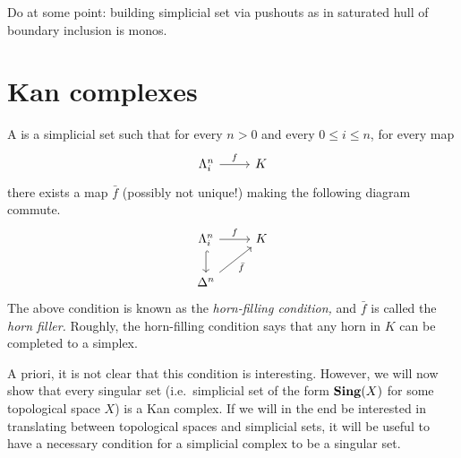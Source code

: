 \documentclass[main.tex]{subfiles}
\begin{document}
Do at some point: building simplicial set via pushouts as in saturated hull of boundary inclusion is monos.


\section{Kan complexes}
\label{sec:kan_complexes}

\begin{definition}
  \label{def:kan_complex}
  A  is a simplicial set such that for every $n > 0$ and every $0 \leq i \leq n$, for every map
  \begin{equation*}
    \begin{tikzcd}
      \Lambda^{n}_{i}
      \arrow[r, "f"]
      & K
    \end{tikzcd}
  \end{equation*}
  there exists a map $\bar{f}$ (possibly not unique!) making the following diagram commute.
  \begin{equation*}
    \begin{tikzcd}
      \Lambda^{n}_{i}
      \arrow[r, "f"]
      \arrow[d, hookrightarrow]
      & K
      \\
      \Delta^{n}
      \arrow[ur, swap, "\bar{f}"]
    \end{tikzcd}
  \end{equation*}
  The above condition is known as the \emph{horn-filling condition,} and $\bar{f}$ is called the \emph{horn filler.} Roughly, the horn-filling condition says that any horn in $K$ can be completed to a simplex.
\end{definition}

A priori, it is not clear that this condition is interesting. However, we will now show that every singular set (i.e.\ simplicial set of the form $\mathbf{Sing}(X)$ for some topological space $X$) is a Kan complex. If we will in the end be interested in translating between topological spaces and simplicial sets, it will be useful to have a necessary condition for a simplicial complex to be a singular set.
\end{document}

